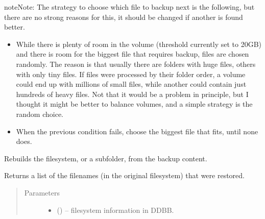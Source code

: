 \documentclass[letterpaper,10pt,english]{sphinxmanual}
\begin{document}
\begin{fulllineitems}
\begin{fulllineitems}
\begin{quote}
\begin{description}
\begin{itemize}
\end{itemize}


\end{description}\end{quote}

\begin{sphinxadmonition}{note}{Note:}
The strategy to choose which file to backup next is the following, but there are no
strong reasons for this, it should be changed if another is found better.
\begin{itemize}
\item {} 
While there is plenty of room in the volume (threshold currently set to 20GB) and there is room
for the biggest file that requires backup, files are chosen randomly.
The reason is that usually there are folders with huge files, others with only tiny files.
If files were processed by their folder order, a volume could end up with millions
of small files, while another could contain just hundreds of heavy files. Not that it would
be a problem in principle, but I thought it might be better to balance volumes, and
a simple strategy is the random choice.

\item {} 
When the previous condition fails, choose the biggest file that fits, until none does.

\end{itemize}
\end{sphinxadmonition}

\end{fulllineitems}


\begin{fulllineitems}
\label{\detokenize{index:fsbackup.hashVolume.HashVolume.checkout}}
Rebuilds the filesystem, or a subfolder, from the backup content.

Returns a list of the filenames (in the original filesystem) that were restored.
\begin{quote}\begin{description}
\item[{Parameters}] \leavevmode\begin{itemize}
\item {} 
 ({\hyperref[\detokenize{index:fsbackup.fileDB.FileDB}]{}}) -- filesystem information in DDBB.


\end{itemize}
\end{description}
\end{quote}
\end{fulllineitems}
\end{fulllineitems}
\end{document}
